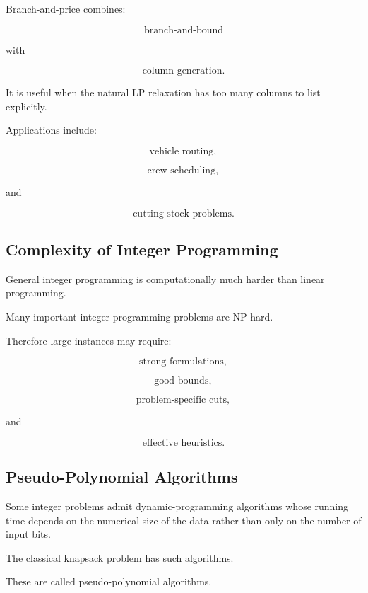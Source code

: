Branch-and-price combines:

\[
\boxed{
\text{branch-and-bound}
}
\]

with

\[
\boxed{
\text{column generation}.
}
\]

It is useful when the natural LP relaxation has too many columns to list
explicitly.

Applications include:

\[
\boxed{
\text{vehicle routing},
}
\]

\[
\boxed{
\text{crew scheduling},
}
\]

and

\[
\boxed{
\text{cutting-stock problems}.
}
\]

\subsection{Complexity of Integer Programming}
\label{subsec:integer-programming-complexity}

General integer programming is computationally much harder than linear
programming.

Many important integer-programming problems are NP-hard.

Therefore large instances may require:

\[
\boxed{
\text{strong formulations},
}
\]

\[
\boxed{
\text{good bounds},
}
\]

\[
\boxed{
\text{problem-specific cuts},
}
\]

and

\[
\boxed{
\text{effective heuristics}.
}
\]

\subsection{Pseudo-Polynomial Algorithms}
\label{subsec:pseudo-polynomial-integer}

Some integer problems admit dynamic-programming algorithms whose running
time depends on the numerical size of the data rather than only on the
number of input bits.

The classical knapsack problem has such algorithms.

These are called pseudo-polynomial algorithms.

